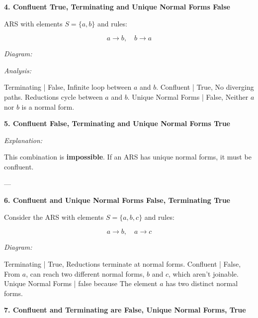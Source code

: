 \documentclass{article}
\theoremstyle{theorem}
\theoremstyle{definition}
\theoremstyle{remark}
\begin{document}
{  \textbf{4. Confluent True, Terminating and Unique Normal Forms False}

ARS with elements \( S = \{ a, b \} \) and rules:

  \[
    a \to b, \quad b \to a
  \]

  \textit{Diagram:}

  \begin{center}
  \end{center}

  \textit{Analysis:}

Terminating | False, Infinite loop between \( a \) and \( b \).
Confluent | True, No diverging paths. Reductions cycle between \( a \) and \( b \).
Unique Normal Forms | False, Neither \( a \) nor \( b \) is a normal form.

  \textbf{5. Confluent False, Terminating and Unique Normal Forms True}

  \textit{Explanation:}

  This combination is \textbf{impossible}. If an ARS has unique normal forms, it must be confluent.

  ---

  \textbf{6. Confluent and Unique Normal Forms False, Terminating True}

  Consider the ARS with elements \( S = \{ a, b, c \} \) and rules:

  \[
    a \to b, \quad a \to c
  \]

  \textit{Diagram:}

  \begin{center}
  \end{center}

Terminating | True, Reductions terminate at normal forms.
Confluent | False, From \( a \), can reach two different normal forms, \( b \) and \( c \), which aren't joinable.
Unique Normal Forms | false because The element \( a \) has two distinct normal forms.

  \textbf{7. Confluent and Terminating are False, Unique Normal Forms, True}


}
\end{document}

